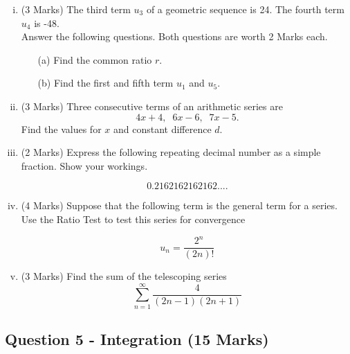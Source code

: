 ﻿ \documentclass[a4paper,12pt]{article}
\begin{document}
\begin{enumerate}[(i)]
	\item (3 Marks)
	The third term $u_3$ of a geometric sequence is 24. The fourth term $u_4$ is -48. \\ \bigskip Answer the following questions. Both questions are worth 2 Marks each.
	\begin{itemize}
		\item[(a)] Find the common ratio $r$. 
		\item[(b)] Find the first and fifth term $u_1$ and $u_5$.
	\end{itemize}
	
	
	\bigskip
	
	\item (3 Marks)	Three consecutive terms of an arithmetic series are 
	\[4x+4,\;\;6x-6,\;\;7x-5.\]
	Find the values for $x$ and constant difference $d$.
	
		\bigskip
		
		\item (2 Marks) Express the following repeating decimal number as a simple fraction. Show your workings.
		
		\[0.2162162162162....\]
		
	\bigskip
	\item (4 Marks) Suppose that the following term is the general term for a series. Use the Ratio Test to test this series for convergence
	
	\[u_n=\frac{2^n}{(2n)!}\]
	
	\bigskip
	
	\item (3 Marks) Find the sum of the telescoping series  \[ \sum^{\infty}_{n=1} \frac{4
		}{(2n-1)(2n+1)}\]
	

	\newpage

\end{enumerate}
\subsection*{Question 5 - Integration (15 Marks)}



\end{document}

